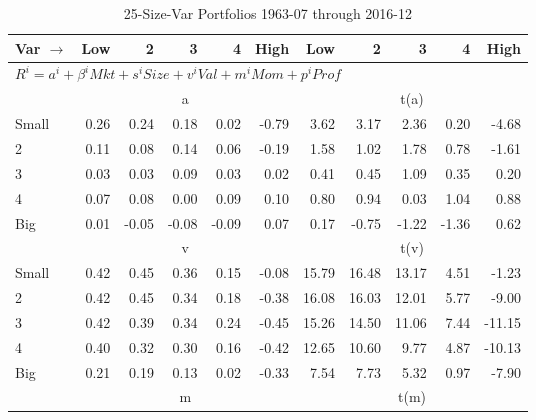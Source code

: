 
\begin{table}[!ht]
\footnotesize
\centering
\caption{25-Size-Var Portfolios 1963-07 through 2016-12}
\begin{tabular}{lrrrrrrrrrr}
  \toprule
    Var $\rightarrow$ & Low & 2 & 3 & 4 & High & Low & 2 & 3 & 4 & High \\ 
  \midrule
  \multicolumn{11}{l}{$R^i=a^i+\beta^iMkt+s^iSize+v^iVal+m^iMom+p^iProf$} \\

  
    
      & \multicolumn{5}{c}{a} & \multicolumn{5}{c}{t(a)}
    
    \\
      \cmidrule(r){2-6} \cmidrule(r){7-11}

    Small   & 0.26  & 0.24  & 0.18  & 0.02  & -0.79  & 3.62  & 3.17  & 2.36  & 0.20  & -4.68  \\
         2  & 0.11  & 0.08  & 0.14  & 0.06  & -0.19  & 1.58  & 1.02  & 1.78  & 0.78  & -1.61  \\
         3  & 0.03  & 0.03  & 0.09  & 0.03  & 0.02  & 0.41  & 0.45  & 1.09  & 0.35  & 0.20  \\
         4  & 0.07  & 0.08  & 0.00  & 0.09  & 0.10  & 0.80  & 0.94  & 0.03  & 1.04  & 0.88  \\
    Big     & 0.01  & -0.05  & -0.08  & -0.09  & 0.07  & 0.17  & -0.75  & -1.22  & -1.36  & 0.62  \\

  
    
      & \multicolumn{5}{c}{v} & \multicolumn{5}{c}{t(v)}
    
    \\
      \cmidrule(r){2-6} \cmidrule(r){7-11}

    Small   & 0.42  & 0.45  & 0.36  & 0.15  & -0.08  & 15.79  & 16.48  & 13.17  & 4.51  & -1.23  \\
         2  & 0.42  & 0.45  & 0.34  & 0.18  & -0.38  & 16.08  & 16.03  & 12.01  & 5.77  & -9.00  \\
         3  & 0.42  & 0.39  & 0.34  & 0.24  & -0.45  & 15.26  & 14.50  & 11.06  & 7.44  & -11.15  \\
         4  & 0.40  & 0.32  & 0.30  & 0.16  & -0.42  & 12.65  & 10.60  & 9.77  & 4.87  & -10.13  \\
    Big     & 0.21  & 0.19  & 0.13  & 0.02  & -0.33  & 7.54  & 7.73  & 5.32  & 0.97  & -7.90  \\

  
    
      & \multicolumn{5}{c}{m} & \multicolumn{5}{c}{t(m)}
    

\end{tabular}
\end{table}
